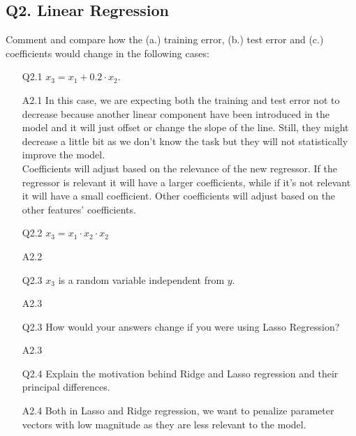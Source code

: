 \documentclass[11pt]{scrartcl}
\begin{document}
\subsection*{Q2. Linear Regression}
Comment and compare how the (a.) training error, (b.) test error and (c.) coefficients would change in the following cases:
\begin{itemize}
\item[Q2.1] $x_3 = x_1 + 0.2 \cdot x_2$.
\item[A2.1] In this case, we are expecting both the training and test error not to decrease because another linear component have been introduced in the model and it will just offset or change the slope of the line. Still, they might decrease a little bit as we don't know the task but they will not statistically improve the model. \\
Coefficients will adjust based on the relevance of the new regressor. If the regressor is relevant it will have a larger coefficients, while if it's not relevant it will have a small coefficient. Other coefficients will adjust based on the other features' coefficients.

\item[Q2.2] $x_3 = x_1 \cdot x_2 \cdot x_2$
\item[A2.2] ~\\

\item[Q2.3] $x_3$ is a random variable independent from $y$.
\item[A2.3] ~\\

\item[Q2.3] How would your answers change if you were using Lasso Regression?
\item[A2.3] ~\\

\item[Q2.4] Explain the motivation behind Ridge and Lasso regression and their principal differences.
\item[A2.4] Both in Lasso and Ridge regression, we want to penalize parameter vectors with low magnitude as they are less relevant to the model.
\end{itemize}
\end{document}
